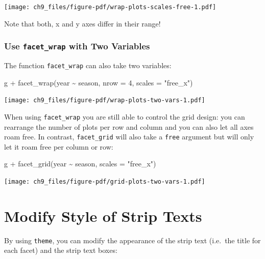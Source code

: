 \documentclass[
  letterpaper,
  DIV=11,
  numbers=noendperiod]{scrreprt}
\newenvironment{Shaded}{\begin{snugshade}}{\end{snugshade}}
\newcommand{\AttributeTok}[1]{\textcolor[rgb]{0.40,0.45,0.13}{#1}}
\newcommand{\DecValTok}[1]{\textcolor[rgb]{0.68,0.00,0.00}{#1}}
\newcommand{\FunctionTok}[1]{\textcolor[rgb]{0.28,0.35,0.67}{#1}}
\newcommand{\NormalTok}[1]{\textcolor[rgb]{0.00,0.23,0.31}{#1}}
\newcommand{\SpecialCharTok}[1]{\textcolor[rgb]{0.37,0.37,0.37}{#1}}
\newcommand{\StringTok}[1]{\textcolor[rgb]{0.13,0.47,0.30}{#1}}
\begin{document}
\texttt{[image: ch9\_files/figure-pdf/wrap-plots-scales-free-1.pdf]}

Note that both, x and y axes differ in their range!

\subsubsection{\texorpdfstring{Use \texttt{facet\_wrap} with Two
Variables}{Use facet\_wrap with Two Variables}}\label{use-facet_wrap-with-two-variables}

The function \texttt{facet\_wrap} can also take two variables:

\begin{Shaded}
\begin{Highlighting}[]
\NormalTok{g }\SpecialCharTok{+} \FunctionTok{facet\_wrap}\NormalTok{(year }\SpecialCharTok{\textasciitilde{}}\NormalTok{ season, }\AttributeTok{nrow =} \DecValTok{4}\NormalTok{, }\AttributeTok{scales =} \StringTok{"free\_x"}\NormalTok{)}
\end{Highlighting}
\end{Shaded}

\texttt{[image: ch9\_files/figure-pdf/wrap-plots-two-vars-1.pdf]}

When using \texttt{facet\_wrap} you are still able to control the grid
design: you can rearrange the number of plots per row and column and you
can also let all axes roam free. In contrast, \texttt{facet\_grid} will
also take a \texttt{free} argument but will only let it roam free per
column or row:

\begin{Shaded}
\begin{Highlighting}[]
\NormalTok{g }\SpecialCharTok{+} \FunctionTok{facet\_grid}\NormalTok{(year }\SpecialCharTok{\textasciitilde{}}\NormalTok{ season, }\AttributeTok{scales =} \StringTok{"free\_x"}\NormalTok{)}
\end{Highlighting}
\end{Shaded}

\texttt{[image: ch9\_files/figure-pdf/grid-plots-two-vars-1.pdf]}

\section{Modify Style of Strip Texts}\label{modify-style-of-strip-texts}

By using \texttt{theme}, you can modify the appearance of the strip text
(i.e.~the title for each facet) and the strip text boxes:
\end{document}
